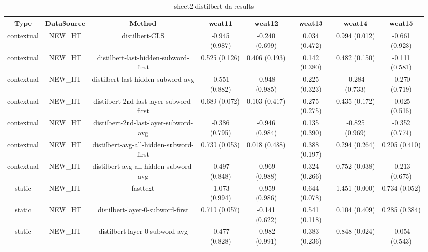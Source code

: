 \begin{sidewaystable}[htb]
    \centering
    \caption{sheet2 distilbert da results}
    \label{appendix_tab:sheet2_distilbert_da_results}
    \small
    \begin{tabular}{@{}cccccccc@{}}
        \toprule
        Type & DataSource & Method & weat11 & weat12 & weat13 & weat14 & weat15 \\
        \midrule
        contextual & NEW\_HT & distilbert-CLS & -0.945 (0.987) & -0.240 (0.699) & 0.034 (0.472) & 0.994 (0.012) & -0.661 (0.928) \\
        contextual & NEW\_HT & distilbert-last-hidden-subword-first & 0.525 (0.126) & 0.406 (0.193) & 0.142 (0.380) & 0.482 (0.150) & -0.111 (0.581) \\
        contextual & NEW\_HT & distilbert-last-hidden-subword-avg & -0.551 (0.882) & -0.948 (0.985) & 0.225 (0.323) & -0.284 (0.733) & -0.270 (0.719) \\
        contextual & NEW\_HT & distilbert-2nd-last-layer-subword-first & 0.689 (0.072) & 0.103 (0.417) & 0.275 (0.275) & 0.435 (0.172) & -0.025 (0.515) \\
        contextual & NEW\_HT & distilbert-2nd-last-layer-subword-avg & -0.386 (0.795) & -0.946 (0.984) & 0.135 (0.390) & -0.825 (0.969) & -0.352 (0.774) \\
        contextual & NEW\_HT & distilbert-avg-all-hidden-subword-first & 0.730 (0.053) & 0.018 (0.488) & 0.388 (0.197) & 0.294 (0.264) & 0.205 (0.410) \\
        contextual & NEW\_HT & distilbert-avg-all-hidden-subword-avg & -0.497 (0.848) & -0.969 (0.988) & 0.324 (0.266) & 0.752 (0.038) & -0.213 (0.675) \\
        static & NEW\_HT & fasttext & -1.073 (0.994) & -0.959 (0.986) & 0.644 (0.078) & 1.451 (0.000) & 0.734 (0.052) \\
        static & NEW\_HT & distilbert-layer-0-subword-first & 0.710 (0.057) & -0.141 (0.622) & 0.541 (0.118) & 0.104 (0.409) & 0.285 (0.384) \\
        static & NEW\_HT & distilbert-layer-0-subword-avg & -0.477 (0.828) & -0.982 (0.991) & 0.383 (0.236) & 0.848 (0.024) & -0.054 (0.543) \\
        \bottomrule
    \end{tabular}
\end{sidewaystable}